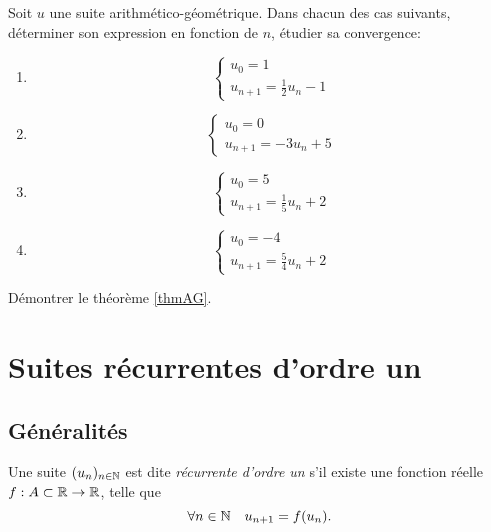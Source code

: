 \documentclass[../main.tex]{subfiles}
\begin{document}
\begin{exo}[F]
    Soit $u$ une suite arithmético-géométrique. Dans chacun des cas suivants, déterminer son expression en fonction de $n$, étudier sa convergence:
    \begin{multicols}{2}
    \begin{enumerate}
        \item \[\begin{cases}
            u_0 = 1 \\
            u_{n+1} = \frac{1}{2}u_n - 1
        \end{cases}\]
        \item \[\begin{cases}
            u_0 = 0 \\
            u_{n+1} = -3u_n + 5
        \end{cases}
        \]
        \item \[\begin{cases}
            u_0 = 5 \\
            u_{n+1} = \frac{1}{5}u_n + 2
        \end{cases}
        \]
        \item \[\begin{cases}
            u_0 = -4 \\
            u_{n+1} = \frac{5}{4}u_n + 2
        \end{cases}
        \]
    \end{enumerate}
    \end{multicols}
\end{exo}

\begin{exo}[M]
    Démontrer le théorème \ref{thmAG}.
\end{exo}


\section{Suites récurrentes d'ordre un}

\subsection{Généralités}

\begin{mydef}
    Une suite $(u_n)_{n\in\mathbb N}$ est dite \textit{récurrente d'ordre un} s'il existe une fonction réelle $f:A\subset\mathbb R \rightarrow\mathbb R$, telle que
    \[
    \forall n\in\mathbb N
    \quad u_{n+1} = f(u_n). \]
\end{mydef}
\end{document}
